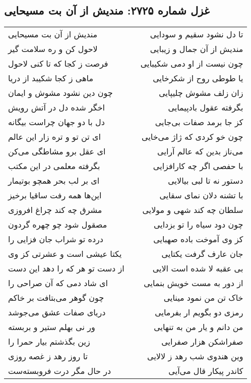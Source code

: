 \begin{center}
\section*{غزل شماره ۲۷۲۵: مندیش از آن بت مسیحایی}
\label{sec:2725}
\begin{longtable}{l p{0.5cm} r}
مندیش از آن بت مسیحایی
&&
تا دل نشود سقیم و سودایی
\\
لاحول کن و ره سلامت گیر
&&
مندیش از آن جمال و زیبایی
\\
فرصت ز کجا که تا کنی لاحول
&&
چون نیست از او دمی شکیبایی
\\
ماهی ز کجا شکیبد از دریا
&&
یا طوطی روح از شکرخایی
\\
چون دین نشود مشوش و ایمان
&&
زان زلف مشوش چلیپایی
\\
اخگر شده دل در آتش رویش
&&
بگرفته عقول بادپیمایی
\\
دل با دو جهان چراست بیگانه
&&
کز جا برمد صفات بی‌جایی
\\
ای تن تو و تره زار این عالم
&&
چون خو کردی که ژاژ می‌خایی
\\
ای عقل برو مشاطگی می‌کن
&&
می‌ناز بدین که عالم آرایی
\\
بگرفته معلمی در این مکتب
&&
با حفصی اگر چه کارافزایی
\\
ای بر لب بحر همچو بوتیمار
&&
دستور نه تا لبی بیالایی
\\
این‌ها همه رفت ساقیا برخیز
&&
با تشنه دلان نمای سقایی
\\
مشرق چه کند چراغ افروزی
&&
سلطان چه کند شهی و مولایی
\\
مصقول شود چو چهره گردون
&&
چون دود سیاه را تو بزدایی
\\
درده تو شراب جان فزایی را
&&
کز وی آموخت باده صهبایی
\\
یکتا عیشی است و عشرتی کز وی
&&
جان عارف گرفت یکتایی
\\
از دست تو هر که را دهد این دست
&&
بی عقبه لا شده است الایی
\\
ای شاد دمی که آن صراحی را
&&
از دور به مست خویش بنمایی
\\
چون گوهر می‌بتافت بر خاکم
&&
خاک تن من نمود مینایی
\\
دریای صفات عشق می‌جوشد
&&
رمزی دو بگویم ار بفرمایی
\\
ور نی بهلم ستیر و بربسته
&&
من دانم و یار من به تنهایی
\\
زین بگذشتم بیار حمرا را
&&
صفراشکن هزار صفرایی
\\
تا روز رهد ز غصه روزی
&&
وین هندوی شب رهد ز لالایی
\\
در حال مگر درت فروبسته‌ست
&&
کاندر پیکار قال می‌آیی
\\
\end{longtable}
\end{center}
